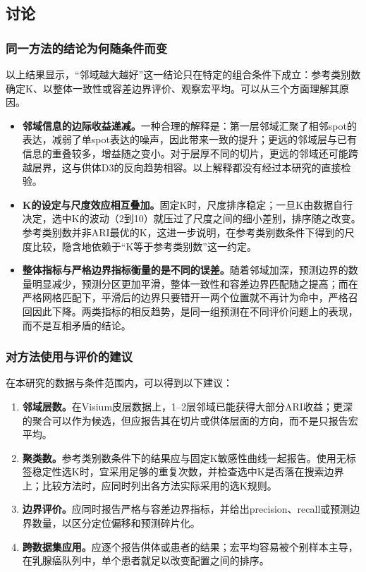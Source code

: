 \subsection{讨论}
\label{subsec:cc-discussion-p1}

\subsubsection{同一方法的结论为何随条件而变}
以上结果显示，“邻域越大越好”这一结论只在特定的组合条件下成立：参考类别数确定K、以整体一致性或容差边界评价、观察宏平均。可以从三个方面理解其原因。
\begin{itemize}
  \item \textbf{邻域信息的边际收益递减。}一种合理的解释是：第一层邻域汇聚了相邻spot的表达，减弱了单spot表达的噪声，因此带来一致的提升；更远的邻域层与已有信息的重叠较多，增益随之变小。对于层厚不同的切片，更远的邻域还可能跨越层界，这与供体D3的反向趋势相容。以上解释都没有经过本研究的直接检验。
  \item \textbf{K的设定与尺度效应相互叠加。}固定K时，尺度排序稳定；一旦K由数据自行决定，选中K的波动（2到10）就压过了尺度之间的细小差别，排序随之改变。参考类别数并非ARI最优的K，这进一步说明，在参考类别数条件下得到的尺度比较，隐含地依赖于“K等于参考类别数”这一约定。
  \item \textbf{整体指标与严格边界指标衡量的是不同的误差。}随着邻域加深，预测边界的数量明显减少，预测分区更加平滑，整体一致性和容差边界匹配随之提高；而在严格网格匹配下，平滑后的边界只要错开一两个位置就不再计为命中，严格召回因此下降。两类指标的相反趋势，是同一组预测在不同评价问题上的表现，而不是互相矛盾的结论。
\end{itemize}

\subsubsection{对方法使用与评价的建议}
在本研究的数据与条件范围内，可以得到以下建议：
\begin{enumerate}
  \item \textbf{邻域层数。}在Visium皮层数据上，1--2层邻域已能获得大部分ARI收益；更深的聚合可以作为候选，但应报告其在切片或供体层面的方向，而不是只报告宏平均。
  \item \textbf{聚类数。}参考类别数条件下的结果应与固定K敏感性曲线一起报告。使用无标签稳定性选K时，宜采用足够的重复次数，并检查选中K是否落在搜索边界上；比较方法时，应同时列出各方法实际采用的选K规则。
  \item \textbf{边界评价。}应同时报告严格与容差边界指标，并给出precision、recall或预测边界数量，以区分定位偏移和预测碎片化。
  \item \textbf{跨数据集应用。}应逐个报告供体或患者的结果；宏平均容易被个别样本主导，在乳腺癌队列中，单个患者就足以改变配置之间的排序。
\end{enumerate}


